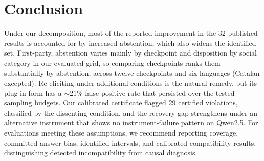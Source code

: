 \section{Conclusion}
\label{sec:conclusion}

Under our decomposition, most of the reported improvement in the 32 published
results is accounted for by increased abstention, which also widens the
identified set. First-party, abstention varies mainly by checkpoint and
disposition by social category in our evaluated grid, so comparing
checkpoints ranks them substantially by abstention, across twelve checkpoints and six
languages (Catalan excepted). Re-eliciting under additional
conditions is the natural remedy, but its plug-in form has a $\sim$21\%
false-positive rate that persisted over the tested sampling budgets. Our
calibrated certificate flagged 29 certified violations, classified by the
dissenting condition, and the recovery gap strengthens under an alternative
instrument that shows no instrument-failure pattern on Qwen2.5. For evaluations meeting
these assumptions, we recommend reporting coverage, committed-answer bias,
identified intervals, and calibrated compatibility results, distinguishing
detected incompatibility from causal diagnosis.
